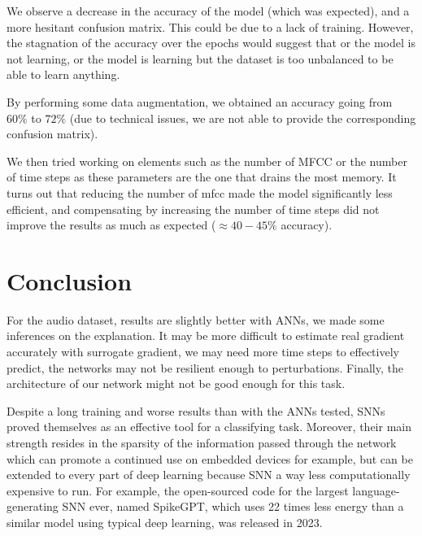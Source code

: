 \documentclass[11pt]{article}
\begin{document}
We observe a decrease in the accuracy of the model (which was expected), and a more hesitant confusion matrix. This could be due to a lack of training. However, the stagnation of the accuracy over the epochs would suggest that or the model is not learning, or the model is learning but the dataset is too unbalanced to be able to learn anything.

By performing some data augmentation, we obtained an accuracy going from $60\%$ to $72\%$ (due to technical issues, we are not able to provide the corresponding confusion matrix).

We then tried working on elements such as the number of MFCC or the number of time steps as these parameters are the one that drains the most memory. It turns out that reducing the number of mfcc made the model significantly less efficient, and compensating by increasing the number of time steps did not improve the results as much as expected ($\approx 40-45\%$ accuracy).

\pagebreak

\section{Conclusion}

For the audio dataset, results are slightly better with ANNs, we made some inferences on the explanation. It may be more difficult to estimate real gradient accurately with surrogate gradient, we may need more time steps to effectively predict, the networks may not be resilient enough to perturbations. Finally, the architecture of our network might not be good enough for this task.

Despite a long training and worse results than with the ANNs tested, SNNs proved themselves as an effective tool for a classifying task. Moreover, their main strength resides in the sparsity of the information passed through the network which can promote a continued use on embedded devices for example, but can be extended to every part of deep learning because SNN a way less computationally expensive to run. For example, the open-sourced code for the largest language-generating SNN ever, named SpikeGPT, which uses 22 times less energy than a similar model using typical deep learning, was released in 2023.
\cite{zhu2023spikegpt}

\pagebreak



\end{document}
